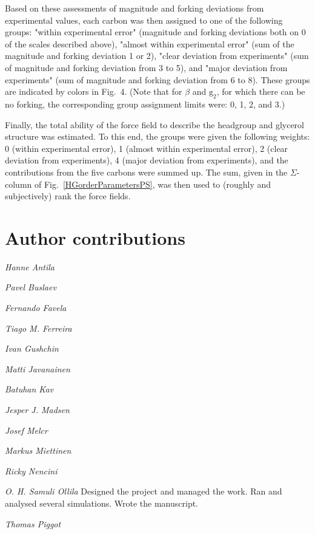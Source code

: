 \documentclass[journal=jpcbfk]{achemso}
\begin{document}
\noindent Based on these assessments of magnitude and forking deviations from experimental values,
each carbon was then assigned to one of the following groups: "within experimental error"
(magnitude and forking deviations both on 0 of the scales described above),
"almost within experimental error"
(sum of the magnitude and forking deviation 1 or 2),
"clear deviation from experiments"
(sum of magnitude and forking deviation from 3 to 5), and
"major deviation from experiments"
(sum of magnitude and forking deviation from 6 to 8).
These groups are indicated by colors in Fig.~4.
(Note that for $\beta$ and $\mathrm{g_2}$, for which there can be no forking,
the corresponding group assignment limits were: 0, 1, 2, and 3.)

Finally, the total ability of the force field to describe the headgroup and
glycerol structure was estimated.
To this end, the groups were given the following weights:
0 (within experimental error),
1 (almost within experimental error),
2 (clear deviation from experiments),
4 (major deviation from experiments),
and the contributions from the five carbons were summed up.
The sum, given in the $\Sigma$-column of Fig.~\ref{HGorderParametersPS},
was then used to (roughly and subjectively) rank the force fields.

\section{Author contributions}
\noindent
{\it Hanne Antila}

\noindent
{\it Pavel Buslaev}

\noindent
{\it Fernando Favela}

\noindent
{\it Tiago M. Ferreira}

\noindent
{\it Ivan Gushchin}

\noindent
{\it Matti Javanainen}

\noindent
{\it Batuhan Kav}

\noindent
{\it Jesper J. Madsen}

\noindent
{\it Josef Melcr}

\noindent
{\it Markus Miettinen}

\noindent
{\it Ricky Nencini}

\noindent
{\it O. H. Samuli Ollila}
Designed the project and managed the work.
Ran and analysed several simulations. Wrote the manuscript.

\noindent
{\it Thomas Piggot}


\clearpage

\end{document}
